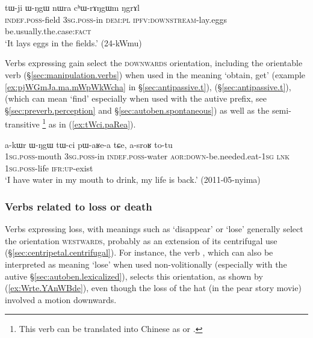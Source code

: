 \begin{exe}
\ex \label{ex:chWrANgWm}
\gll tɯ-ji ɯ-ŋgɯ nɯra cʰɯ-rɤŋgɯm ŋgrɤl \\
\textsc{indef}.\textsc{poss}-field \textsc{3sg}.\textsc{poss}-in \textsc{dem}:\textsc{pl} \textsc{ipfv}:\textsc{downstream}-lay.eggs be.usually.the.case:\textsc{fact} \\
\glt `It lays eggs in the fields.' (24-kWmu) 
\end{exe}

Verbs expressing gain select the \textsc{downwards} orientation, including the orientable verb  (§\ref{sec:manipulation.verbs}) when used in the meaning `obtain, get' (example \ref{ex:pjWGmJa.ma.mWpWkWcha} in §\ref{sec:antipassive.t}),  (§\ref{sec:antipassive.t}),  (which can mean `find' especially when used with the autive prefix, see §\ref{sec:preverb.perception} and §\ref{sec:autoben.spontaneous}) as well as the semi-transitive \footnote{This verb can be translated into Chinese as  or .} as in (\ref{ex:tWci.paRea}).
  
\begin{exe}
\ex \label{ex:tWci.paRea}
\gll a-kɯr ɯ-ŋgɯ tɯ-ci pɯ-aʁe-a tɕe, a-sroʁ to-tu  \\
\textsc{1sg}.\textsc{poss}-mouth \textsc{3sg}.\textsc{poss}-in \textsc{indef}.\textsc{poss}-water \textsc{aor}:\textsc{down}-be.needed.eat-\textsc{1sg} \textsc{lnk} \textsc{1sg}.\textsc{poss}-life \textsc{ifr}:\textsc{up}-exist \\
\glt `I have water in my mouth to drink, my life is back.' (2011-05-nyima)
\end{exe} 

\subsubsection{Verbs related to loss or death} \label{sec:preverb.loss}
Verbs expressing loss, with meanings such as `disappear' or `lose' generally select the orientation \textsc{westwards}, probably as an extension of its centrifugal use (§\ref{sec:centripetal.centrifugal}). For instance, the verb , which can also be interpreted as meaning `lose' when used non-volitionally (especially with the autive §\ref{sec:autoben.lexicalized}), selects this orientation, as shown by (\ref{ex:Wrte.YAnWBde}), even though the loss of the hat (in the pear story movie) involved a motion downwards.
 
